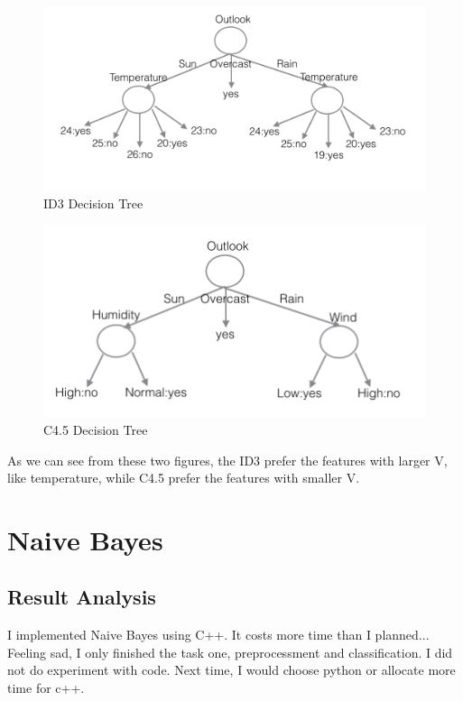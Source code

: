\documentclass{article} %
\begin{document}
\begin{figure}[!htbp]
\begin{center}
\includegraphics[width=120mm]{pic/id3.png}
\end{center}
\label{id3}
\caption{ID3 Decision Tree}
\end{figure}

\begin{figure}[!htbp]
\begin{center}
\includegraphics[width=120mm]{pic/c45.png}
\end{center}
\label{c45}
\caption{C4.5 Decision Tree}
\end{figure}

As we can see from these two figures, the ID3 prefer the features with larger V,
like temperature, while C4.5 prefer the features with smaller V.



\section{Naive Bayes}


\subsection{Result Analysis}
I implemented Naive Bayes using C++. It costs more time than I planned...
Feeling sad, I only finished the task one, preprocessment and classification.
I did not do experiment with code. Next time, I would choose python or
allocate more time for c++.
\end{document}
